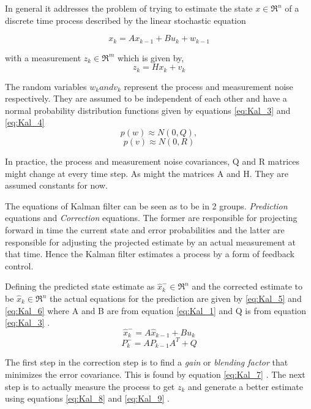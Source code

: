 In general it addresses the problem of trying to estimate the state $ x \in \Re^n $ of a discrete time process described by the linear stochastic equation

\begin{equation}[h]
\label{eq:Kal_1}
x_k = Ax_{k-1} + Bu_k + w_{k-1}
\end{equation}

with a measurement $ z_k \in \Re^m $ which is given by,
\begin{equation}[h]
\label{eq:Kal_2}
z_k=Hx_k+v_k
\end{equation}

The random variables $ w_k and v_k$ represent the process and measurement noise respectively. They are assumed to be independent of each other and have a normal probability distribution functions given by equations \ref{eq:Kal_3} and \ref{eq:Kal_4}
\begin{equation}
\label{eq:Kal_3}
p(w)\approx N(0,Q),
\end{equation} 
\begin{equation}
\label{eq:Kal_4}
p(v) \approx N(0,R)
\end{equation}

In practice, the process and measurement noise covariances, Q and R matrices might change at every time step. As might the matrices A and H. They are assumed constants for now. 

The equations of Kalman filter can be seen as to be in 2 groups. \textit{Prediction} equations and \textit{Correction} equations. The former are responsible for projecting forward in time the current state and error probabilities and the latter are responsible for adjusting the projected estimate by an actual measurement at that time. Hence the Kalman filter estimates a process by a form of feedback control. 

Defining the predicted state estimate as $ \hat{x}^-_k \in \Re^n $ and the corrected estimate to be $ \hat{x}_k \in \Re^n $ the actual equations for the prediction are given by \ref{eq:Kal_5} and \ref{eq:Kal_6} where A and B are from equation \ref{eq:Kal_1} and Q is from equation \ref{eq:Kal_3} \cite{WelchandBishop1995}.
\begin{equation}
\label{eq:Kal_5}
\hat{x}^-_k = A\hat{x}_{k-1}+Bu_k
\end{equation}
\begin{equation}
\label{eq:Kal_6}
P^-_k = AP_{k-1}A^T+Q
\end{equation}

The first step in the correction step is to find a \textit{gain} or \textit{blending factor} that minimizes the error covariance. This is found by equation \ref{eq:Kal_7} \cite{Kalman1960,Maybeck1979,Jacobs1993,Brown2012}. 
The next step is to actually measure the process to get $ z_k $ and generate a better estimate using equations \ref{eq:Kal_8} and \ref{eq:Kal_9} \cite{WelchandBishop1995}.


